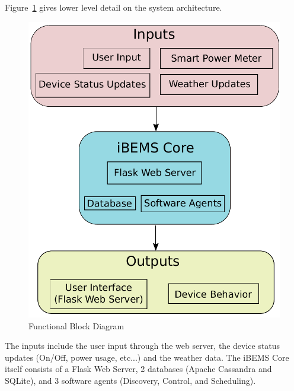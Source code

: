 Figure~\ref{fig:functional_bd} gives lower level detail on the system
architecture. %
%
\begin{figure}
  \centering
  \includegraphics[scale=0.3]{figs/functionalBlockDiagram.pdf}
  \caption{Functional Block Diagram}
  \label{fig:functional_bd}
\end{figure}
%
The inputs include the user input through the web server, the device status
updates (On/Off, power usage, etc...) and the weather data. The iBEMS Core
itself consists of a Flask Web Server, 2 databases (Apache Cassandra and
SQLite), and 3 software agents (Discovery, Control, and Scheduling).


